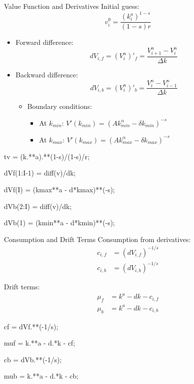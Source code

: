 \documentclass[]{beamer}
\newenvironment{code}{\begin{semiverbatim}\footnotesize}{\end{semiverbatim}}
\begin{document}
\begin{frame}{Value Function and Derivatives}
    Initial guess:
    \begin{equation}
        v_i^0 = \frac{(k_i^a)^{1-s}}{(1-s)r}
    \end{equation}
    
    \begin{itemize}
    \item Forward difference:
        \[dV_{i,f} = (V_i^n)'_f = \frac{V_{i+1}^n - V_i^n}{\Delta k}\]
        \item Backward difference:
        \[dV_{i,b} = (V_i^n)'_b = \frac{V_i^n - V_{i-1}^n}{\Delta k}\]

    \begin{itemize}
        \item Boundary conditions:
        \begin{itemize}
            \item At $k_{min}$: $V'(k_{min}) = (Ak_{min}^{\alpha} - \delta k_{min})^{-s}$
            \item At $k_{max}$: $V'(k_{max}) = (Ak_{max}^{\alpha} - \delta k_{max})^{-s}$
        \end{itemize}
    \end{itemize}
    
    \end{itemize}
    
    \begin{code}
    tv = (k.**a).**(1-s)/(1-s)/r;

    dVf(1:I-1) = diff(v)/dk;
    
    dVf(I) = (kmax**a - d*kmax)**(-s);
    
    dVb(2:I) = diff(v)/dk;

    dVb(1) = (kmin**a - d*kmin)**(-s);
    \end{code}



\end{frame}

\begin{frame}{Consumption and Drift Terms}
    Consumption from derivatives:
    \begin{align}
        c_{i,f} &= (dV_{i,f})^{-1/s} \tag{5} \\
        c_{i,b} &= (dV_{i,b})^{-1/s} \tag{6}
    \end{align}
    
    Drift terms:
    \begin{align}
        \mu_f &= k^a - dk - c_{i,f} \tag{7} \\
        \mu_b &= k^a - dk - c_{i,b} \tag{8}
    \end{align}
    
    \begin{code}
    cf = dVf.**(-1/s);
    
    muf = k.**a - d.*k - cf;
    
    cb = dVb.**(-1/s);
    
    mub = k.**a - d.*k - cb;
    \end{code}
\end{frame}
\end{document}

